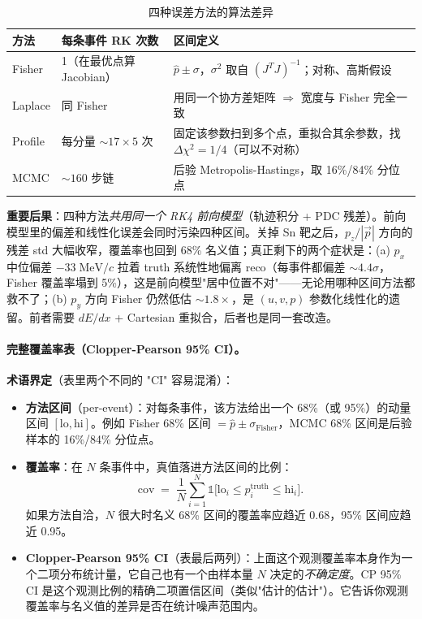 \documentclass[a4paper, 11pt]{article}
\begin{document}
\begin{table}[H]
\centering\footnotesize
\caption{四种误差方法的算法差异}
\begin{tabular}{lll}
\toprule
方法 & 每条事件 RK 次数 & 区间定义 \\
\midrule
Fisher  & 1（在最优点算 Jacobian） & $\hat{p}\pm\sigma$，$\sigma^2$ 取自 $(J^TJ)^{-1}$；对称、高斯假设 \\
Laplace & 同 Fisher                 & 用同一个协方差矩阵 $\Rightarrow$ 宽度与 Fisher 完全一致 \\
Profile & 每分量 $\sim\!17\!\times\!5$ 次 & 固定该参数扫到多个点，重拟合其余参数，找 $\Delta\chi^2{=}1/4$（可以不对称） \\
MCMC    & $\sim\!160$ 步链          & 后验 Metropolis-Hastings，取 16\%/84\% 分位点 \\
\bottomrule
\end{tabular}
\end{table}

\textbf{重要后果}：四种方法\emph{共用同一个 RK4 前向模型}（轨迹积分 + PDC 残差）。前向模型里的偏差和线性化误差会同时污染四种区间。关掉 Sn 靶之后，$p_z/|\vec p|$ 方向的残差 std 大幅收窄，覆盖率也回到 68\% 名义值；真正剩下的两个症状是：(a) $p_x$ 中位偏差 $-33\;\mathrm{MeV}/c$ 拉着 truth 系统性地偏离 reco（每事件都偏差 $\sim 4.4\sigma$，Fisher 覆盖率塌到 5\%），这是前向模型"居中位置不对"——无论用哪种区间方法都救不了；(b) $p_y$ 方向 Fisher 仍然低估 $\sim 1.8\times$，是 $(u,v,p)$ 参数化线性化的遗留。前者需要 $dE/dx$ + Cartesian 重拟合，后者也是同一套改造。

\paragraph{完整覆盖率表（Clopper-Pearson 95\% CI）。}

\textbf{术语界定}（表里两个不同的 "CI" 容易混淆）：
\begin{itemize}[nosep]
  \item \textbf{方法区间}（per-event）：对每条事件，该方法给出一个 68\%（或 95\%）的动量区间 $[\mathrm{lo},\mathrm{hi}]$。例如 Fisher 68\% 区间 $=\hat{p}\pm\sigma_\mathrm{Fisher}$，MCMC 68\% 区间是后验样本的 16\%/84\% 分位点。
  \item \textbf{覆盖率}：在 $N$ 条事件中，真值落进方法区间的比例：
  \[
    \mathrm{cov} \;=\; \frac{1}{N}\sum_{i=1}^{N}\mathbb{1}\bigl[\mathrm{lo}_i \le p^{\mathrm{truth}}_i \le \mathrm{hi}_i\bigr].
  \]
  如果方法自洽，$N$ 很大时名义 68\% 区间的覆盖率应趋近 0.68，95\% 区间应趋近 0.95。
  \item \textbf{Clopper-Pearson 95\% CI}（表最后两列）：上面这个观测覆盖率本身作为一个二项分布统计量，它自己也有一个由样本量 $N$ 决定的\emph{不确定度}。CP 95\% CI 是这个观测比例的精确二项置信区间（类似"估计的估计"）。它告诉你观测覆盖率与名义值的差异是否在统计噪声范围内。
\end{itemize}
\end{document}
